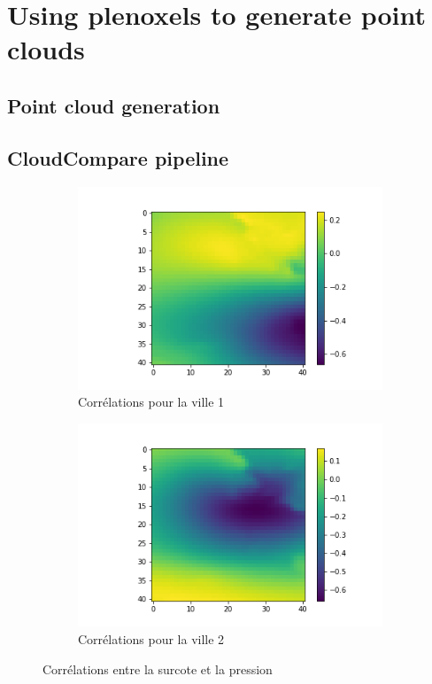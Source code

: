 \documentclass{article}
\begin{document}
\section{Using plenoxels to generate point clouds}

\subsection{Point cloud generation}

\subsection{CloudCompare pipeline}


\begin{figure}[!h]
 \centering
\begin{subfigure}{.45\textwidth}
  \centering
  \includegraphics[width=\linewidth]{figs/corr1_.png}  
  \caption{Corrélations pour la ville 1}
         \label{fig:raw}
\end{subfigure}
\begin{subfigure}{.45\textwidth}
  \centering
  \includegraphics[width=\linewidth]{figs/corr2_.png}
  \caption{Corrélations pour la ville 2}
         \label{fig:rotated}
     \end{subfigure}
     \caption{Corrélations entre la surcote et la pression}
    \label{fig:corr}
\end{figure}
\end{document}
